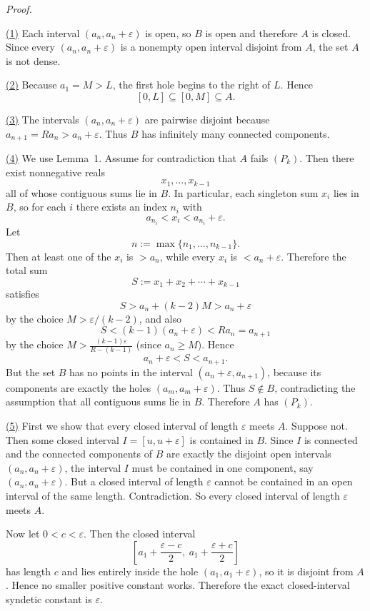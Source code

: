 \medskip
\noindent\emph{Proof.}

\underline{(1)}
Each interval $(a_n,a_n+\varepsilon)$ is open, so $B$ is open and therefore $A$ is closed.
Since every $(a_n,a_n+\varepsilon)$ is a nonempty open interval disjoint from $A$, the set $A$ is not dense.

\smallskip
\underline{(2)}
Because $a_1=M>L$, the first hole begins to the right of $L$. Hence
\[
[0,L]\subseteq [0,M]\subseteq A.
\]

\smallskip
\underline{(3)}
The intervals $(a_n,a_n+\varepsilon)$ are pairwise disjoint because $a_{n+1}=Ra_n>a_n+\varepsilon$.
Thus $B$ has infinitely many connected components.

\smallskip
\underline{(4)}
We use Lemma~1.
Assume for contradiction that $A$ fails $(P_k)$. Then there exist nonnegative reals
\[
 x_1,\dots,x_{k-1}
\]
all of whose contiguous sums lie in $B$.
In particular, each singleton sum $x_i$ lies in $B$, so for each $i$ there exists an index $n_i$ with
\[
 a_{n_i}<x_i<a_{n_i}+\varepsilon.
\]
Let
\[
 n:=\max\{n_1,\dots,n_{k-1}\}.
\]
Then at least one of the $x_i$ is $>a_n$, while every $x_i$ is $<a_n+\varepsilon$.
Therefore the total sum
\[
 S:=x_1+x_2+\cdots+x_{k-1}
\]
satisfies
\[
S>a_n+(k-2)M>a_n+\varepsilon
\]
by the choice $M>\varepsilon/(k-2)$, and also
\[
S<(k-1)(a_n+\varepsilon)<Ra_n=a_{n+1}
\]
by the choice $M>\frac{(k-1)\varepsilon}{R-(k-1)}$ (since $a_n\ge M$).
Hence
\[
 a_n+\varepsilon < S < a_{n+1}.
\]
But the set $B$ has no points in the interval $(a_n+\varepsilon,a_{n+1})$, because its components are exactly the holes $(a_m,a_m+\varepsilon)$.
Thus $S\notin B$, contradicting the assumption that all contiguous sums lie in $B$.
Therefore $A$ has $(P_k)$.

\smallskip
\underline{(5)}
First we show that every closed interval of length $\varepsilon$ meets $A$.
Suppose not. Then some closed interval $I=[u,u+\varepsilon]$ is contained in $B$.
Since $I$ is connected and the connected components of $B$ are exactly the disjoint open intervals $(a_n,a_n+\varepsilon)$, the interval $I$ must be contained in one component, say $(a_n,a_n+\varepsilon)$.
But a closed interval of length $\varepsilon$ cannot be contained in an open interval of the same length. Contradiction.
So every closed interval of length $\varepsilon$ meets $A$.

Now let $0<c<\varepsilon$.
Then the closed interval
\[
\left[a_1+\frac{\varepsilon-c}{2},\ a_1+\frac{\varepsilon+c}{2}\right]
\]
has length $c$ and lies entirely inside the hole $(a_1,a_1+\varepsilon)$, so it is disjoint from $A$.
Hence no smaller positive constant works.
Therefore the exact closed-interval syndetic constant is $\varepsilon$.

